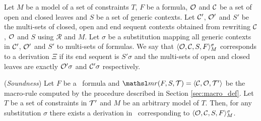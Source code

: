 \begin{definition}[Correspondence]
Let $M$ be a model of a set of constraints $T$, $F$ be a formula, $\mathcal{O}$ and
$\mathcal{C}$ be a set of open and closed leaves and $S$ be a set of generic contexts.
Let $\mathcal{C}'$, $\mathcal{O}'$ and $S'$ be the multi-sets of closed,
open and end sequent contexts obtained from rewriting $\mathcal{C}$, $\mathcal{O}$ and
$S$ using $\mathcal{R}$ and $M$. 
Let $\sigma$ be a substitution mapping all
generic contexts in $\mathcal{C}'$, $\mathcal{O}'$ and $S'$ to multi-sets of formulas.
We say that $\langle \mathcal{O}, \mathcal{C}, S, F \rangle_M^{\sigma}$ corresponds to a derivation
$\Xi$ if its end sequent is $S'\sigma$ and the multi-sets of open and closed
leaves are exactly $\mathcal{O}'\sigma$ and $\mathcal{C}'\sigma$ respectively.
\end{definition}

\begin{theorem}
\label{thm:soundness}
(\textit{Soundness})
Let $F$ be a \sellf\ formula and $\mr{F}{S}{\Tscr} = \langle \Cscr, \Oscr,
\Tscr' \rangle$
be the macro-rule computed by the procedure described in Section 
\ref{sec:macro_def}. Let $T$ be a set of constraints in $\mathcal{T}'$ and $M$ be an
arbitrary model of $T$. 
Then, for any substitution $\sigma$ there
exists a derivation in \sellf\ corresponding to $\langle \mathcal{O}, \mathcal{C}, S, F
\rangle_M^{\sigma}$.  




\end{theorem}

